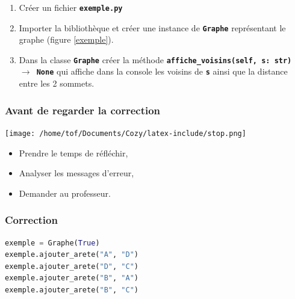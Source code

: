 \documentclass[svgnames,11pt]{beamer}
\begin{document}
\begin{frame}
    \frametitle{}
    \begin{center}
        \label{exemple}
    \end{center}
    \begin{activite}
    \begin{enumerate}
        \item Créer un fichier \textbf{\texttt{exemple.py}}
        \item Importer la bibliothèque et créer une instance de \textbf{\texttt{Graphe}} représentant le graphe (figure \ref{exemple}).
        \item Dans la classe \textbf{\texttt{Graphe}} créer la méthode \textbf{\texttt{affiche\_voisins(self, s: str) $\rightarrow$ None}} qui affiche dans la console les voisins de \textbf{\texttt{s}} ainsi que la distance entre les 2 sommets. 
    \end{enumerate}
    \end{activite}

\end{frame}
\begin{frame}
    \frametitle{Avant de regarder la correction}
\begin{center}
    \centering
    \texttt{[image: /home/tof/Documents/Cozy/latex-include/stop.png]}
    \end{center}
{\Large
    \begin{itemize}
        \item Prendre le temps de réfléchir,
        \item Analyser les messages d'erreur,
        \item Demander au professeur.
    \end{itemize}
}
\end{frame}
\begin{frame}[fragile]
    \frametitle{Correction}

\begin{center}
\begin{lstlisting}[language=Python , basicstyle=\ttfamily\small, xleftmargin=2em, xrightmargin=2em]
exemple = Graphe(True)
exemple.ajouter_arete("A", "D")
exemple.ajouter_arete("D", "C")
exemple.ajouter_arete("B", "A")
exemple.ajouter_arete("B", "C")
\end{lstlisting}
\label{CODE}
\end{center}

\end{frame}
\end{document}
